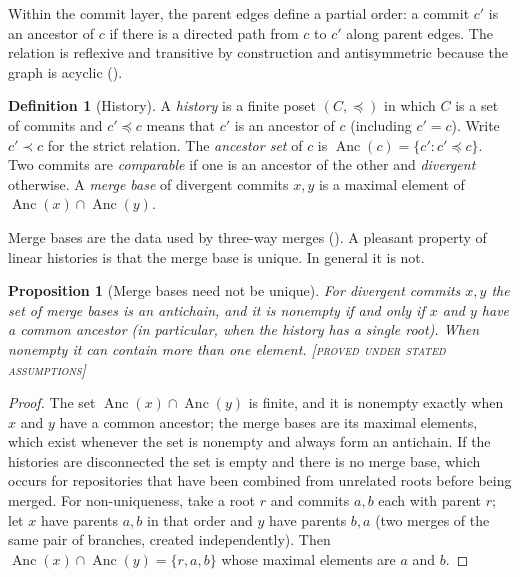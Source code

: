\documentclass[11pt,twoside,openright]{book}
\theoremstyle{plain}
\newtheorem{proposition}[theorem]{Proposition}
\theoremstyle{definition}
\newtheorem{definition}[theorem]{Definition}
\theoremstyle{remark}
\newcommand{\Proved}{\textup{\textsc{[proved under stated assumptions]}}}
\newcommand{\anc}{\preceq}
\DeclareMathOperator{\Anc}{Anc}
\begin{document}
Within the commit layer, the parent edges define a partial order: a commit $c'$ is an ancestor of $c$ if there is a directed path from $c$ to $c'$ along parent edges. The relation is reflexive and transitive by construction and antisymmetric because the graph is acyclic ().

\begin{definition}[History]\label{def:history}
A \emph{history} is a finite poset $(C,\anc)$ in which $C$ is a set of commits and $c'\anc c$ means that $c'$ is an ancestor of $c$ (including $c'=c$). Write $c'\prec c$ for the strict relation. The \emph{ancestor set} of $c$ is $\Anc(c)=\{c':c'\anc c\}$. Two commits are \emph{comparable} if one is an ancestor of the other and \emph{divergent} otherwise. A \emph{merge base} of divergent commits $x,y$ is a maximal element of $\Anc(x)\cap\Anc(y)$.
\end{definition}

Merge bases are the data used by three-way merges (). A pleasant property of linear histories is that the merge base is unique. In general it is not.

\begin{proposition}[Merge bases need not be unique]\label{prop:mergebase}
For divergent commits $x,y$ the set of merge bases is an antichain, and it is nonempty if and only if $x$ and $y$ have a common ancestor (in particular, when the history has a single root). When nonempty it can contain more than one element.
\Proved{}
\end{proposition}

\begin{proof}
The set $\Anc(x)\cap\Anc(y)$ is finite, and it is nonempty exactly when $x$ and $y$ have a common ancestor; the merge bases are its maximal elements, which exist whenever the set is nonempty and always form an antichain. If the histories are disconnected the set is empty and there is no merge base, which occurs for repositories that have been combined from unrelated roots before being merged. For non-uniqueness, take a root $r$ and commits $a,b$ each with parent $r$; let $x$ have parents $a,b$ in that order and $y$ have parents $b,a$ (two merges of the same pair of branches, created independently). Then $\Anc(x)\cap\Anc(y)=\{r,a,b\}$ whose maximal elements are $a$ and $b$.
\end{proof}
\end{document}
